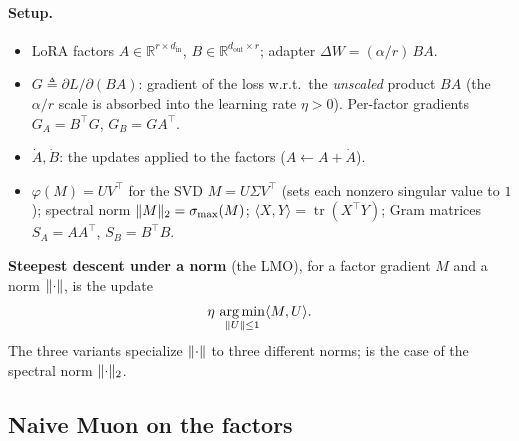 \documentclass[11pt]{article}
\newcommand{\R}{\mathbb{R}}
\DeclareMathOperator*{\argmin}{arg\,min}
\newcommand{\smax}{\sigma_{\max}}
\DeclarePairedDelimiter{\norm}{\lVert}{\rVert}
\newcommand{\DW}{\Delta W}
\newcommand{\polar}{\varphi}                 %
\theoremstyle{plain}
\theoremstyle{definition}
\theoremstyle{remark}
\begin{document}
\paragraph{Setup.}
\begin{itemize}[leftmargin=1.5em,itemsep=1pt,topsep=2pt]
  \item LoRA factors $A\in\R^{r\times d_{\mathrm{in}}}$, $B\in\R^{d_{\mathrm{out}}\times r}$; adapter $\DW=(\alpha/r)\,BA$.
  \item $G\triangleq\partial L/\partial(BA)$: gradient of the loss w.r.t.\ the \emph{unscaled} product $BA$ (the $\alpha/r$ scale is absorbed into the learning rate $\eta>0$). Per-factor gradients $G_A=B^\top G$, $G_B=GA^\top$.
  \item $\dot A,\dot B$: the updates applied to the factors ($A\leftarrow A+\dot A$).
  \item $\polar(M)=UV^\top$ for the SVD $M=U\Sigma V^\top$ (sets each nonzero singular value to $1$); spectral norm $\norm{M}_2=\smax(M)$; $\langle X,Y\rangle=\operatorname{tr}(X^\top Y)$; Gram matrices $S_A=AA^\top$, $S_B=B^\top B$.
\end{itemize}
\textbf{Steepest descent under a norm} (the LMO), for a factor gradient $M$ and a norm $\norm{\cdot}$, is the update
\begin{equation}
  \eta\,\argmin_{\norm{U}\le1}\langle M,U\rangle .
  \label{eq:lmo}
\end{equation}
The three variants specialize $\norm{\cdot}$ to three different norms;  is the case of the spectral norm $\norm{\cdot}_2$.

\subsection{Naive Muon on the factors}
\label{sec:method-naive}
\end{document}
